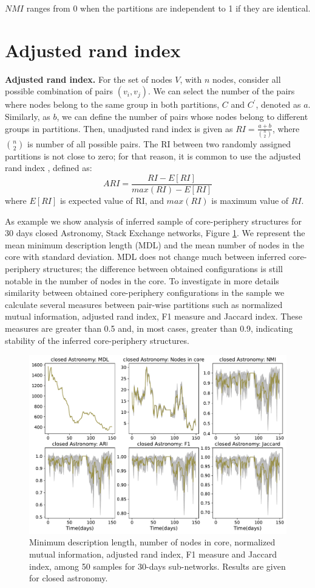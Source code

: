 $NMI$ ranges from 0 when the partitions are independent to 1 if they are identical.   

\section{Adjusted rand index}

\textbf{Adjusted rand index.} For the set of nodes $V$, with $n$ nodes, consider all possible combination of pairs $(v_i, v_j)$. We can select the number of the pairs where nodes belong to the same group in both partitions, $C$ and  $C^{'}$, denoted as $a$. Similarly, as $b$, we can define the number of pairs whose nodes belong to different groups in partitions. Then, unadjusted rand index \cite{santos2009use} is given as $RI = \frac{a+b}{\binom{n}{2}}$, where $\binom{n}{2}$ is number of all possible pairs. The RI between two randomly assigned partitions is not close to zero; for that reason, it is common to use the adjusted rand index \cite{hubert1985comparing} , defined as:
\begin{equation}
ARI = \frac{RI - E[RI]}{max(RI)- E[RI]}
\end{equation}
where $E[RI]$ is expected value of RI, and $max(RI)$ is maximum value of $RI$. 

As example we show analysis of inferred sample of  core-periphery structures for 30 days closed Astronomy, Stack Exchange networks, Figure \ref{fig:sample}. We represent the mean minimum description length (MDL) and the mean number of nodes in the core with standard deviation. MDL does not change much between inferred core-periphery structures; the difference between obtained configurations is still notable in the number of nodes in the core.  To investigate in more details similarity between obtained core-periphery configurations in the sample we calculate several measures between pair-wise partitions such as normalized mutual information, adjusted rand index, F1 measure and Jaccard index. These measures are greater than 0.5 and, in most cases, greater than 0.9, indicating stability of the inferred core-periphery structures.


\begin{figure}[h]
	\centering
	\includegraphics[width=0.8\linewidth]{figures/stackexchange/blockmodel_robust.pdf}
	\caption{Minimum description length, number of nodes in core, normalized mutual information, adjusted rand index, F1 measure and Jaccard index, among 50 samples for 30-days sub-networks. Results are given for closed astronomy. }
	\label{fig:sample}
\end{figure}
